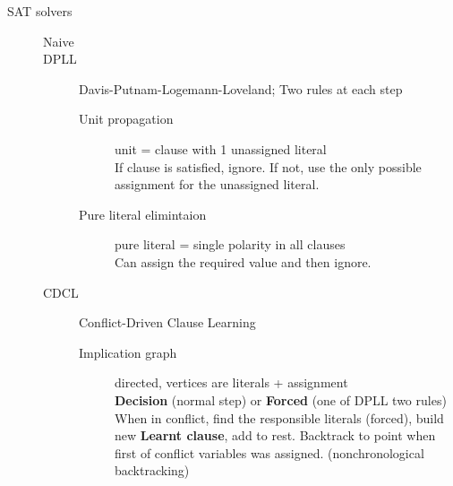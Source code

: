 \documentclass[a4paper]{article}
\begin{document}
\begin{description}
\begin{minipage}[t]{\linewidth}
{		}
	\end{minipage}
\item[SAT solvers] \hfill
	\begin{description}
		\item[Naive]
		\item[DPLL] Davis-Putnam-Logemann-Loveland; Two rules at each step \hfill
			\begin{description}
				\item[Unit propagation] unit = clause with 1 unassigned literal \hfill\\
					If clause is satisfied, ignore. If not, use the only possible assignment for the unassigned literal.
				\item[Pure literal elimintaion] pure literal = single polarity in all clauses \hfill\\
					Can assign the required value and then ignore.
			\end{description}
		\item[CDCL] Conflict-Driven Clause Learning \hfill
			\begin{description}
				\item[Implication graph] directed, vertices are literals + assignment \hfil\\
					\textbf{Decision} (normal step) or \textbf{Forced} (one of DPLL two rules)
					When in conflict, find the responsible literals (forced), build new \textbf{Learnt clause}, add to rest. Backtrack to point when first of conflict variables was assigned. (nonchronological backtracking) \\
					\begin{minipage}[t]{\linewidth}
						\raggedright
						\vspace{-0.5cm}
					\end{minipage}
					\begin{minipage}[t]{\linewidth}
						\raggedright
\end{minipage}
\end{description}
\end{description}
\end{description}
\end{document}
